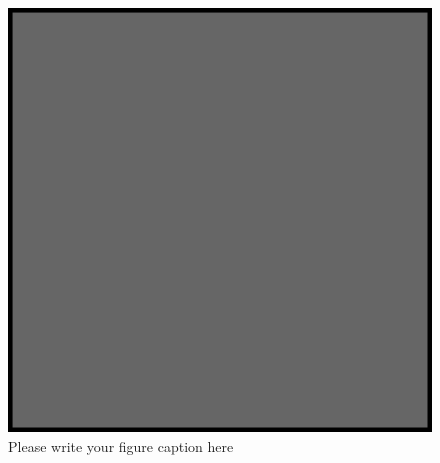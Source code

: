 
 

\iffalse %

\begin{figure}
\includegraphics{example.eps}
\caption{Please write your figure caption here}
\label{fig:1}       %
\end{figure}
%
